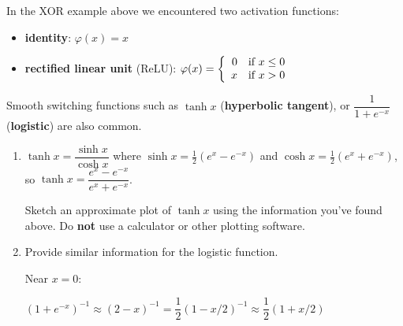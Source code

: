 \documentclass[12pt,letterpaper,noanswers]{exam}
\begin{document}
\begin{tcolorbox}
In the XOR example above we encountered two activation functions:
\begin{itemize}
\itemsep0pt
    \item \textbf{identity}: $\varphi(x) = x$
    \item \textbf{rectified linear unit} (ReLU): $\varphi(x) = \left\{\begin{array}{r r}
    0 & \text{if }x\leq 0 \\
    x & \text{if }x>0\end{array}\right.$
\end{itemize}
Smooth switching functions such as $\tanh x$ (\textbf{hyperbolic tangent}), or $\dfrac{1}{1+e^{-x}}$ (\textbf{logistic}) are also common.
\end{tcolorbox}
\begin{enumerate}[resume=classQ]
\item $\tanh x = \dfrac{\sinh x}{\cosh x}$ where $\sinh x = \frac{1}{2}\left(e^{x}-e^{-x}\right)$ and $\cosh x = \frac{1}{2}\left(e^{x}+e^{-x}\right)$, so $\tanh x = \dfrac{e^x-e^{-x}}{e^x+e^{-x}}$.


Sketch an approximate plot of $\tanh x$ using the information you've found above.  Do \textbf{not} use a calculator or other plotting software.
\vspace{1.5in}

\item Provide similar information for the logistic function.

Near $x=0$:

$(1+e^{-x})^{-1}\approx (2-x)^{-1} = \dfrac{1}{2}(1-x/2)^{-1} \approx \dfrac{1}{2}(1+x/2)$
\end{enumerate}
\vspace{1.7in}
\end{document}
